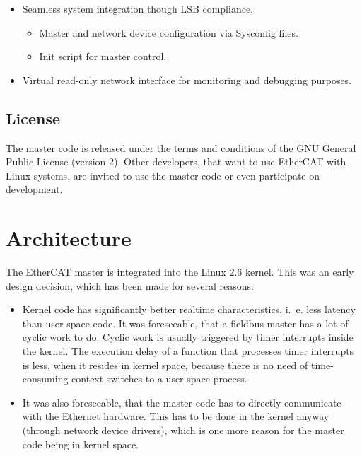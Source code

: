 \documentclass[a4paper,12pt,BCOR6mm,bibtotoc,idxtotoc]{scrbook}
\begin{document}
\begin{itemize}
\begin{itemize}
  \end{itemize}

\item Seamless system integration though LSB compliance.

  \begin{itemize}

  \item Master and network device configuration via Sysconfig files.

  \item Init script for master control.

  \end{itemize}

\item Virtual read-only network interface for monitoring and debugging
  purposes.

\end{itemize}


\section{License}
\label{sec:license}

The master code is released under the terms and conditions of the GNU
General Public License \cite{gpl} (version 2). Other
developers, that want to use EtherCAT with Linux systems, are invited
to use the master code or even participate on development.


\chapter{Architecture}
\label{sec:arch}

The EtherCAT master is integrated into the Linux 2.6 kernel. This was
an early design decision, which has been made for several reasons:

\begin{itemize}

\item Kernel code has significantly better realtime characteristics, i.~e.
less latency than user space code. It was foreseeable, that a fieldbus master
has a lot of cyclic work to do. Cyclic work is usually triggered by timer
interrupts inside the kernel. The execution delay of a function that processes
timer interrupts is less, when it resides in kernel space, because there is no
need of time-consuming context switches to a user space process.

\item It was also foreseeable, that the master code has to directly
communicate with the Ethernet hardware. This has to be done in the kernel
anyway (through network device drivers), which is one more reason for the
master code being in kernel space.

\end{itemize}
\end{document}
